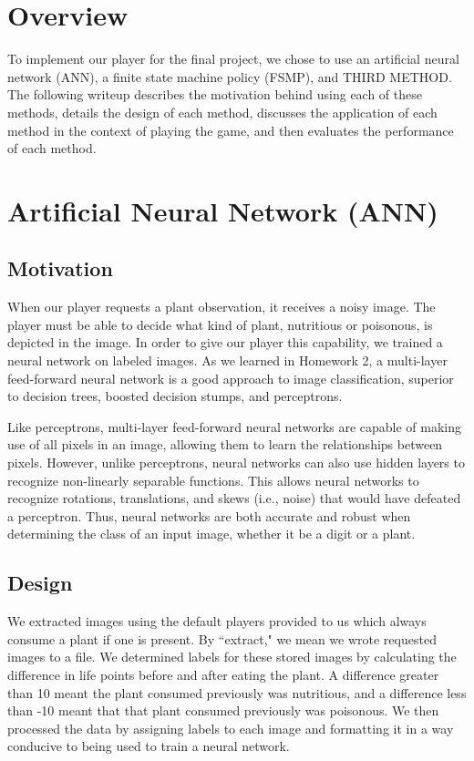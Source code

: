 \documentclass[solution, letterpaper]{cs121}
\begin{document}


\section{Overview}
To implement our player for the final project, we chose to use an artificial neural network (ANN), a finite state machine policy (FSMP), and THIRD METHOD. The following writeup describes the motivation behind using each of these methods, details the design of each method, discusses the application of each method in the context of playing the game, and then evaluates the performance of each method. 

\section{Artificial Neural Network (ANN)}
\subsection{Motivation}
When our player requests a plant observation, it receives a noisy image. The player must be able to decide what kind of plant, nutritious or poisonous, is depicted in the image. In order to give our player this capability, we trained a neural network on labeled images. As we learned in Homework 2, a multi-layer feed-forward neural network is a good approach to image classification, superior to decision trees, boosted decision stumps, and perceptrons. 

Like perceptrons, multi-layer feed-forward neural networks are capable of making use of all pixels in an image, allowing them to learn the relationships between pixels. However, unlike perceptrons, neural networks can also use hidden layers to recognize non-linearly separable functions. This allows neural networks to recognize rotations, translations, and skews (i.e., noise) that would have defeated a perceptron. Thus, neural networks are both accurate and robust when determining the class of an input image, whether it be a digit or a plant.

\subsection{Design}
We extracted images using the default players provided to us which always consume a plant if one is present. By ``extract," we mean we wrote requested images to a file. We determined labels for these stored images by calculating the difference in life points before and after eating the plant. A difference greater than 10 meant the plant consumed previously was nutritious, and a difference less than -10 meant that that plant consumed previously was poisonous. We then processed the data by assigning labels to each image and formatting it in a way conducive to being used to train a neural network.
\end{document}
